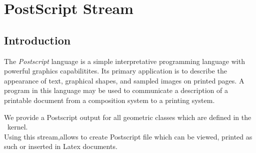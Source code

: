 \chapter{PostScript Stream} \label{Chapter_Postscript}

\section{Introduction}


The {\em Postscript} language is a simple interpretative programming
language with powerful graphics capabilitites. Its primary application
is to describe the appearance of text, graphical shapes, and sampled
images on printed pages. A program in this language may be used to
communicate a description of a printable document from a composition
system to a printing system.

 We provide a Postscript output for all geometric
classes which are defined in the \cgal\ kernel.\\
Using this stream,allows to create
Postscript file which can be viewed, printed as such or inserted in Latex documents.


